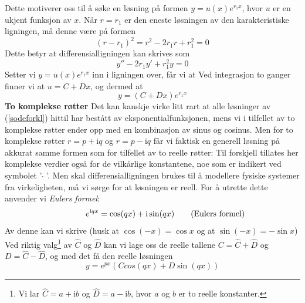{Dette motiverer oss til å søke en løsning på formen $ {y=u(x)e^{r_1x} }$, hvor $ u $ er en ukjent funksjon av $ x $.
Når $ {r=r_1} $ er den eneste løsningen av den karakteristiske ligningen, må denne være på formen
\[ (r-r_1)^2=r^2-2r_1r+r_1^2=0  \]
Dette betyr at differensialligningen kan skrives som
\[ y''-2r_1 y'+r_1^2y=0 \]
Setter vi $ y=u(x)e^{r_1x} $ inn i ligningen over, får vi at
Ved integrasjon to ganger finner vi at $ u=C+Dx $, og dermed at 
\[ y = (C+Dx)e^{r_1x} \]
\textbf{To komplekse røtter}\bs
Det kan kanskje virke litt rart at alle løsninger av (\ref{sodeforkl}) hittil har bestått av eksponentialfunksjonen, mens vi i tilfellet av to komplekse røtter ender opp med en kombinasjon av sinus og cosinus. Men for to komplekse røtter $ {r= p+\mathrm{i}q}$ og $ {r= p-\mathrm{i}q}$ får vi faktisk en generell løsning på akkurat samme formen som for tilfellet av to reelle røtter:
Til forskjell tillates her komplekse verdier også for de vilkårlige konstantene, noe som er indikert ved symbolet '$ \;\hat{}\; $'. Men skal differensialligningen brukes til å modellere fysiske systemer fra virkeligheten, må vi sørge for at løsningen er reell. For å utrette dette anvender vi \textit{Eulers formel}:
\[ \phantom{aaaaaa}e^{\mathrm{i}qx}=\cos(qx)+\mathrm{i}\sin(qx) \tag{\text{Eulers formel}}\]
Av denne kan vi skrive (husk at $ {\cos(-x)=\cos x} $ og at $ {\sin(-x)=-\sin x} $)
\small {}
\normalsize
Ved riktig valg\footnote{Vi lar $ \hat{C}=a+\mathrm{i}b $ og $ \hat{D}=a-\mathrm{i}b $, hvor $ a $ og $ b $ er to reelle konstanter.} av $ \hat{C} $ og $ \hat{D} $ kan vi lage oss de reelle tallene $ {C=\hat{C}+\hat{D}}  $ og $ D=\hat{C}-\hat{D} $, og med det få den reelle løsningen
\[ y =  e^{px}(Ccos (qx) + D \sin (qx))  \]
}


